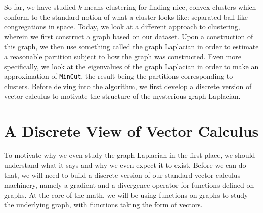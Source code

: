 
So far, we have studied $k$-means clustering for finding nice, convex
clusters which conform to the standard notion of what a cluster looks
like: separated ball-like congregations in space. Today, we look at a
different approach to clustering, wherein we first construct a graph
based on our dataset. Upon a construction of this graph, we then use
something called the graph Laplacian in order to estimate a reasonable
partition subject to how the graph was constructed. Even more
specifically, we look at the eigenvalues of the graph Laplacian in
order to make an approximation of \texttt{MinCut}, the result being the partitions
corresponding to clusters. Before delving into the algorithm, we first
develop a discrete version of vector calculus to motivate the
structure of the mysterious graph Laplacian. 

\section{A Discrete View of Vector Calculus}
To motivate why we even study the graph Laplacian in the first place,
we should understand what it says and why we even expect it to
exist. Before we can do that, we will need to build a discrete version
of our standard vector calculus machinery, namely a gradient and a
divergence operator for functions defined on graphs. At the core of
the math, we will be using functions on graphs to study the underlying
graph, with functions taking the form of vectors.

